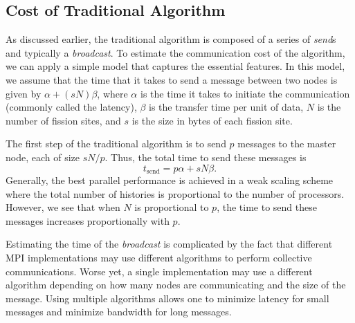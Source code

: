 \documentclass[11pt]{article}
\begin{document}
\subsection{Cost of Traditional Algorithm}
\label{sec:traditional-cost}

As discussed earlier, the traditional algorithm is composed of a
series of \emph{send}s and typically a \emph{broadcast}. To estimate
the communication cost of the algorithm, we can apply a simple model
that captures the essential features. In this model, we assume that
the time that it takes to send a message between two nodes is given by
$\alpha + (sN)\beta$, where $\alpha$ is the time it takes to initiate
the communication (commonly called the latency), $\beta$ is the
transfer time per unit of data, $N$ is the number of fission sites,
and $s$ is the size in bytes of each fission site.

The first step of the traditional algorithm is to send $p$ messages to
the master node, each of size $sN/p$. Thus, the total time to send
these messages is
\begin{equation}\label{eq:t-send}
  t_{\text{send}} = p\alpha + sN\beta.
\end{equation}
Generally, the best parallel performance is achieved in a weak scaling
scheme where the total number of histories is proportional to the
number of processors. However, we see that when $N$ is proportional to
$p$, the time to send these messages increases proportionally with
$p$.

Estimating the time of the \emph{broadcast} is complicated by the fact
that different MPI implementations may use different algorithms to
perform collective communications. Worse yet, a single implementation
may use a different algorithm depending on how many nodes are
communicating and the size of the message. Using multiple algorithms
allows one to minimize latency for small messages and minimize
bandwidth for long messages.
\end{document}
